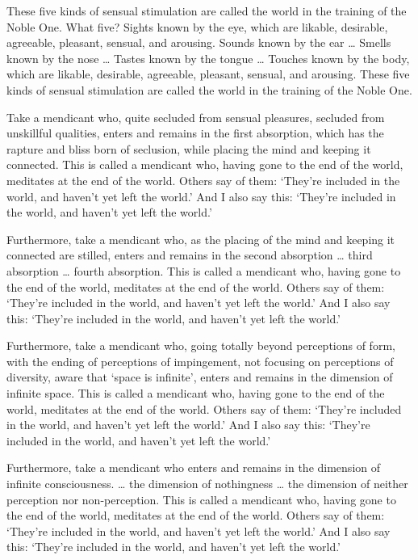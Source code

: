 \documentclass[12pt,openany]{book}%
\begin{document}
These five kinds of sensual stimulation are called the world in the training of the Noble One. What five? Sights known by the eye, which are likable, desirable, agreeable, pleasant, sensual, and arousing. Sounds known by the ear … Smells known by the nose … Tastes known by the tongue … Touches known by the body, which are likable, desirable, agreeable, pleasant, sensual, and arousing. These five kinds of sensual stimulation are called the world in the training of the Noble One. 

Take a mendicant who, quite secluded from sensual pleasures, secluded from unskillful qualities, enters and remains in the first absorption, which has the rapture and bliss born of seclusion, while placing the mind and keeping it connected. This is called a mendicant who, having gone to the end of the world, meditates at the end of the world. Others say of them: ‘They’re included in the world, and haven’t yet left the world.’ And I also say this: ‘They’re included in the world, and haven’t yet left the world.’ 

Furthermore, take a mendicant who, as the placing of the mind and keeping it connected are stilled, enters and remains in the second absorption … third absorption … fourth absorption. This is called a mendicant who, having gone to the end of the world, meditates at the end of the world. Others say of them: ‘They’re included in the world, and haven’t yet left the world.’ And I also say this: ‘They’re included in the world, and haven’t yet left the world.’ 

Furthermore, take a mendicant who, going totally beyond perceptions of form, with the ending of perceptions of impingement, not focusing on perceptions of diversity, aware that ‘space is infinite’, enters and remains in the dimension of infinite space. This is called a mendicant who, having gone to the end of the world, meditates at the end of the world. Others say of them: ‘They’re included in the world, and haven’t yet left the world.’ And I also say this: ‘They’re included in the world, and haven’t yet left the world.’ 

Furthermore, take a mendicant who enters and remains in the dimension of infinite consciousness. … the dimension of nothingness … the dimension of neither perception nor non-perception. This is called a mendicant who, having gone to the end of the world, meditates at the end of the world. Others say of them: ‘They’re included in the world, and haven’t yet left the world.’ And I also say this: ‘They’re included in the world, and haven’t yet left the world.’ 
\end{document}
